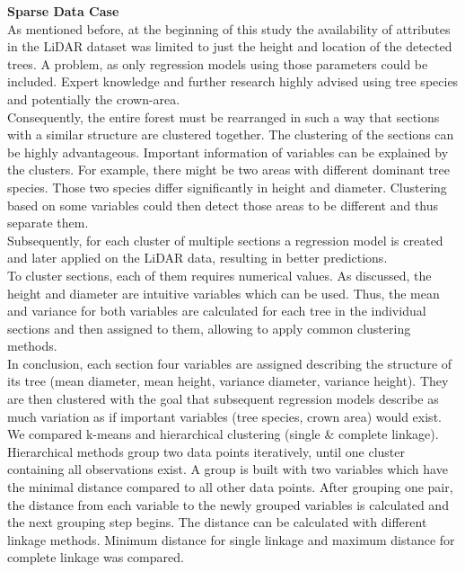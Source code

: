 
\textbf{Sparse Data Case}\\
As mentioned before, at the beginning of this study the availability of attributes in the LiDAR dataset was limited to just the height and location of the detected trees. A problem, as only regression models using those parameters could be included. Expert knowledge and further research highly advised using tree species and potentially the crown-area. \\

Consequently, the entire forest must be rearranged in such a way that sections with a similar structure are clustered together. The clustering of the sections can be highly advantageous. Important information of variables can be explained by the clusters. For example, there might be two areas with different dominant tree species. Those two species differ significantly in height and diameter. Clustering based on some variables could then detect those areas to be different and thus separate them.\\

Subsequently, for each cluster of multiple sections a regression model is created and later applied on the LiDAR data, resulting in better predictions. \\

To cluster sections, each of them requires numerical values. As discussed, the height and diameter are intuitive variables which can be used. Thus, the mean and variance for both variables are calculated for each tree in the individual sections and then assigned to them, allowing to apply common clustering methods.\\

In conclusion, each section four variables are assigned describing the structure of its tree (mean diameter, mean height, variance diameter, variance height). They are then clustered with the goal that subsequent regression models describe as much variation as if important variables (tree species, crown area) would exist.\\

We compared k-means and hierarchical clustering (single \& complete linkage). Hierarchical methods group two data points iteratively, until one cluster containing all observations exist. A group is built with two variables which have the minimal distance compared to all other data points. After grouping one pair, the distance from each variable to the newly grouped variables is calculated and the next grouping step begins. The distance can be calculated with different linkage methods. Minimum distance for single linkage and maximum distance for complete linkage was compared.\\


